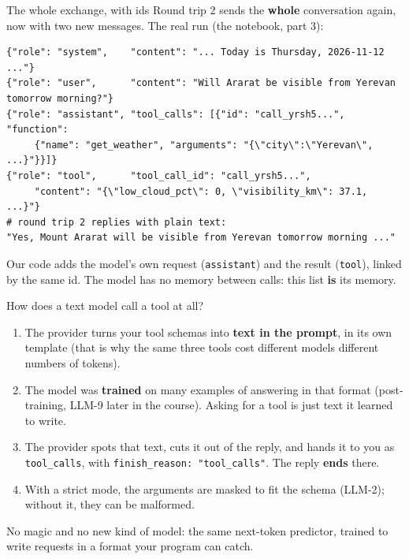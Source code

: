 \documentclass[aspectratio=169]{beamer}
\newcommand{\keybox}[1]{%
  \begin{tcolorbox}[colback=armblue!8, colframe=armblue, boxrule=0.6pt, arc=2pt]
  #1
  \end{tcolorbox}}
\begin{document}
\begin{frame}[fragile]{The whole exchange, with ids}
  \vspace{0.2em}
  {\small Round trip 2 sends the \textbf{whole} conversation again, now with two new messages. The real run
  (the notebook, part 3):}

  \begin{lstlisting}
{"role": "system",    "content": "... Today is Thursday, 2026-11-12 ..."}
{"role": "user",      "content": "Will Ararat be visible from Yerevan tomorrow morning?"}
{"role": "assistant", "tool_calls": [{"id": "call_yrsh5...", "function":
     {"name": "get_weather", "arguments": "{\"city\":\"Yerevan\", ...}"}}]}
{"role": "tool",      "tool_call_id": "call_yrsh5...",
     "content": "{\"low_cloud_pct\": 0, \"visibility_km\": 37.1, ...}"}
# round trip 2 replies with plain text:
"Yes, Mount Ararat will be visible from Yerevan tomorrow morning ..."
\end{lstlisting}

  \vspace{-0.1em}
  {\small Our code adds the model's own request (\texttt{assistant}) and the result (\texttt{tool}), linked by the
  same id. The model has no memory between calls: this list \textbf{is} its memory.}
\end{frame}

\begin{frame}{How does a text model call a tool at all?}
  \vspace{0.6em}
  \begin{enumerate}
    \item[\textbf{1.}] The provider turns your tool schemas into \textbf{text in the prompt}, in its own template
      (that is why the same three tools cost different models different numbers of tokens).
    \item[\textbf{2.}] The model was \textbf{trained} on many examples of answering in that format (post-training,
      LLM-9 later in the course). Asking for a tool is just text it learned to write.
    \item[\textbf{3.}] The provider spots that text, cuts it out of the reply, and hands it to you as
      \texttt{tool\_calls}, with \texttt{finish\_reason: "tool\_calls"}. The reply \textbf{ends} there.
    \item[\textbf{4.}] With a strict mode, the arguments are masked to fit the schema (LLM-2); without it, they
      can be malformed.
  \end{enumerate}

  \vspace{0.5em}
  \keybox{\small No magic and no new kind of model: the same next-token predictor, trained to write requests in a
  format your program can catch.}
\end{frame}
\end{document}
